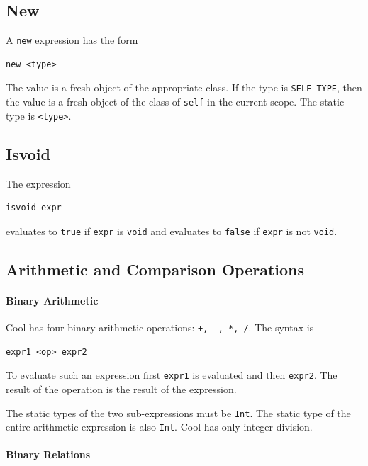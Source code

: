 \documentclass[]{article}
\begin{document}
\subsection{New}

A \texttt{new} expression has the form

\begin{verbatim}
new <type>
\end{verbatim}

The value is a fresh object of the appropriate class. If the type is
\texttt{SELF\_TYPE}, then the value is a fresh object of the class of
\texttt{self} in the current scope. The static type is
\texttt{\textless{}type\textgreater{}}.

\subsection{Isvoid}

The expression

\begin{verbatim}
isvoid expr
\end{verbatim}

evaluates to \texttt{true} if \texttt{expr} is \texttt{void} and
evaluates to \texttt{false} if \texttt{expr} is not \texttt{void}.

\subsection{Arithmetic and Comparison Operations}

\paragraph{Binary Arithmetic}

Cool has four binary arithmetic operations: \texttt{+, -, *, /}. The
syntax is

\begin{verbatim}
expr1 <op> expr2
\end{verbatim}

To evaluate such an expression first \texttt{expr1} is evaluated and
then \texttt{expr2}. The result of the operation is the result of the
expression.

The static types of the two sub-expressions must be \texttt{Int}. The
static type of the entire arithmetic expression is also \texttt{Int}.
Cool has only integer division.

\paragraph{Binary Relations}
\end{document}
